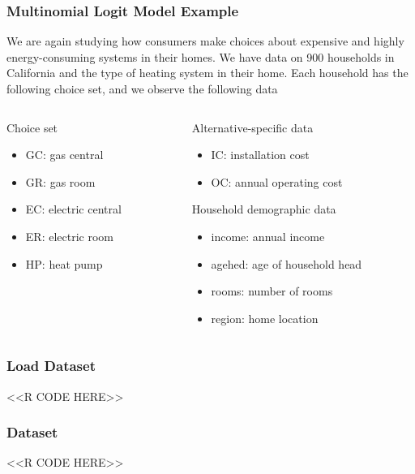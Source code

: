 \documentclass{beamer}
\begin{document}
\begin{frame}\frametitle{Multinomial Logit Model Example}
    We are again studying how consumers make choices about expensive and highly energy-consuming systems in their homes. We have data on 900 households in California and the type of heating system in their home. Each household has the following choice set, and we observe the following data \\
    \vspace{3ex}
    \begin{columns}
    	\begin{column}{0.5\textwidth}
		    Choice set
		    \begin{itemize}
		    	\item GC: gas central
		    	\item GR: gas room
		    	\item EC: electric central
		    	\item ER: electric room
		    	\item HP: heat pump
		    \end{itemize}
		    \vspace{8ex}
	    \end{column}
	    \begin{column}{0.5\textwidth}
		    Alternative-specific data
		    \begin{itemize}
		    	\item IC: installation cost
		    	\item OC: annual operating cost
		    \end{itemize}
		    \vspace{2ex}
		    Household demographic data
		    \begin{itemize}
		    	\item income: annual income
		    	\item agehed: age of household head
		    	\item rooms: number of rooms
                \item region: home location
		    \end{itemize}
		\end{column}
    \end{columns}
\end{frame}

\begin{frame}[fragile]\frametitle{Load Dataset}
    <<R CODE HERE>>
\end{frame}

\begin{frame}[fragile]\frametitle{Dataset}
    <<R CODE HERE>>
\end{frame}
\end{document}
